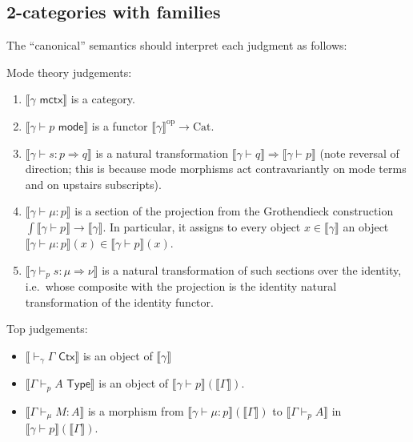 \documentclass[10pt]{article}
\theoremstyle{definition}
\newcommand{\yields}{\vdash}
\newcommand{\tcell}{\Rightarrow}
\newcommand{\CTX}{\,\,\mathsf{Ctx}}
\newcommand{\ctx}{\,\,\mathsf{mctx}}
\newcommand{\TYPE}{\,\,\mathsf{Type}}
\newcommand{\type}{\,\,\mathsf{mode}}
\newcommand\TypeTwo[4]{\ensuremath{#1 \vdash #2 :  #3 \tcell #4}}
\newcommand\TermTwoT[5]{\ensuremath{#1 \vdash_{#5} {#2} : #3 \tcell #4}}
\newcommand\mm[1]{\llbracket #1 \rrbracket}
\newcommand\op{^{\mathrm{op}}}
\newcommand\Cat{\mathrm{Cat}}
\begin{document}
\subsection{2-categories with families}
\label{sec:2cwfs}

The ``canonical'' semantics should interpret each judgment as follows:

Mode theory judgements:
\begin{enumerate}
\item $\mm{\gamma \ctx}$ is a category.
\item $\mm{\gamma \yields p \type}$ is a functor $\mm{\gamma}\op \to \Cat$.
\item $\mm{\TypeTwo{\gamma}{s}{p}{q}}$ is a natural transformation $\mm{\gamma \yields q} \Rightarrow \mm{\gamma \yields p}$ (note reversal of direction; this is because mode morphisms act contravariantly on mode terms and on upstairs subscripts).
\item $\mm{\gamma \yields \mu : p}$ is a section of the projection from the Grothendieck construction $\int\mm{\gamma\yields p} \to \mm{\gamma}$.
  In particular, it assigns to every object $x\in \mm{\gamma}$ an object $\mm{\gamma \yields \mu : p}(x)\in \mm{\gamma\yields p}(x)$.
\item $\mm{\TermTwoT{\gamma}{s}{\mu}{\nu}{p}}$ is a natural transformation of such sections over the identity, i.e.\ whose composite with the projection is the identity natural transformation of the identity functor.
\end{enumerate}

Top judgements: 
\begin{itemize}
\item $\mm{\yields_\gamma \Gamma \CTX}$ is an object of $\mm{\gamma}$
\item $\mm{\Gamma \yields_p A \TYPE}$ is an object of $\mm{\gamma \yields p}(\mm{\Gamma})$.
\item $\mm{\Gamma \yields_\mu M : A}$ is a morphism from $\mm{\gamma \yields \mu : p}(\mm{\Gamma})$ to $\mm{\Gamma \yields_p A}$ in $\mm{\gamma \yields p}(\mm{\Gamma})$.
\end{itemize}
\end{document}

